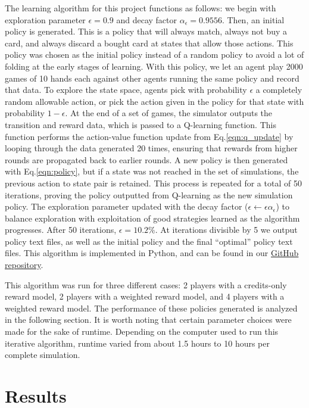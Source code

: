 \documentclass{article}
\begin{document}
The learning algorithm for this project functions as follows: we begin with exploration parameter $\epsilon = 0.9$ and decay factor $\alpha_\epsilon = 0.9556$. Then, an initial policy is generated. This is a policy that will always match, always not buy a card, and always discard a bought card at states that allow those actions. This policy was chosen as the initial policy instead of a random policy to avoid a lot of folding at the early stages of learning. With this policy, we let an agent play 2000 games of 10 hands each against other agents running the same policy and record that data. To explore the state space, agents pick with probability $\epsilon$ a completely random allowable action, or pick the action given in the policy for that state with probability $1-\epsilon$. At the end of a set of games, the simulator outputs the transition and reward data, which is passed to a Q-learning function. This function performs the action-value function update from Eq.\ref{eqn:q_update} by looping through the data generated 20 times, ensuring that rewards from higher rounds are propagated back to earlier rounds. A new policy is then generated with Eq.\ref{eqn:policy}, but if a state was not reached in the set of simulations, the previous action to state pair is retained. This process is repeated for a total of 50 iterations, proving the policy outputted from Q-learning as the new simulation policy. The exploration parameter updated with the decay factor ($\epsilon \leftarrow \epsilon\alpha_\epsilon$) to balance exploration with exploitation of good strategies learned as the algorithm progresses. After 50 iterations, $\epsilon = 10.2\%$. At iterations divisible by 5 we output policy text files, as well as the initial policy and the final ``optimal'' policy text files. This algorithm is implemented in Python, and can be found in our \href{https://github.com/martacor2/corellian\_spike}{GitHub repository}.

This algorithm was run for three different cases: 2 players with a credits-only reward model, 2 players with a weighted reward model, and 4 players with a weighted reward model. The performance of these policies generated is analyzed in the following section. It is worth noting that certain parameter choices were made for the sake of runtime. Depending on the computer used to run this iterative algorithm, runtime varied from about 1.5 hours to 10 hours per complete simulation.

\section{Results}
\end{document}
